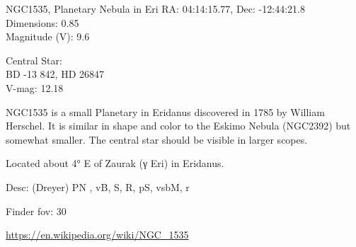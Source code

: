 \begin{block}{NGC1535, Planetary Nebula in Eri}
    RA: 04:14:15.77, Dec: -12:44:21.8 \\ 
    Dimensions: 0.85 \\ 
    Magnitude (V): 9.6

    Central Star: \\ 
      \hspace{1em}BD -13 842, HD 26847 \\ 
      \hspace{1em}V-mag: 12.18 

    NGC1535 is a small Planetary in Eridanus discovered in 1785 by William
    Herschel. It is similar in shape and color to the Eskimo Nebula (NGC2392)
    but somewhat smaller. The central star should be visible in larger scopes.

    Located about 4° E of Zaurak (γ Eri) in Eridanus.

    Desc: (Dreyer) PN , vB, S, R, pS, vsbM, r 

    Finder fov: 30 

    \url{https://en.wikipedia.org/wiki/NGC_1535} 
\end{block}
